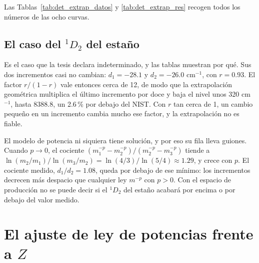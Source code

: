\documentclass[11pt,a4paper]{article}
\begin{document}
Las Tablas~\ref{tab:det_extrap_datos} y \ref{tab:det_extrap_res} recogen todos los números de las
ocho curvas.

\begin{table}[htbp]
  \centering\small
  
  \caption{Los tres últimos tamaños de cada curva de singletes (cm$^{-1}$, referidos al $^3P_0$),
  sus incrementos y la razón entre ellos.}
  \label{tab:det_extrap_datos}
\end{table}

\begin{table}[htbp]
  \centering\small
  
  \caption{Extrapolaciones geométrica y de potencia (cm$^{-1}$), con el error relativo frente al
  NIST entre paréntesis. La tercera columna es el error del último tamaño calculado.}
  \label{tab:det_extrap_res}
\end{table}

\subsection{El caso del \texorpdfstring{$^1D_2$}{1D2} del estaño}

Es el caso que la tesis declara indeterminado, y las tablas muestran por qué. Sus dos incrementos
casi no cambian: $d_1 = -28.1$ y $d_2 = -26.0$ cm$^{-1}$, con $r = 0.93$. El factor $r/(1-r)$ vale
entonces cerca de 12, de modo que la extrapolación geométrica multiplica el último incremento por
doce y baja el nivel unos 320 cm$^{-1}$, hasta 8388.8, un 2.6\,\% por debajo del NIST. Con $r$ tan
cerca de 1, un cambio pequeño en un incremento cambia mucho ese factor, y la extrapolación no es
fiable.

El modelo de potencia ni siquiera tiene solución, y por eso su fila lleva guiones. Cuando
$p \to 0$, el cociente $(m_1^{-p}-m_2^{-p})/(m_2^{-p}-m_3^{-p})$ tiende a
$\ln(m_2/m_1)/\ln(m_3/m_2) = \ln(4/3)/\ln(5/4) \approx 1.29$, y crece con $p$. El cociente medido,
$d_1/d_2 = 1.08$, queda por debajo de ese mínimo: los incrementos decrecen más despacio que
cualquier ley $m^{-p}$ con $p > 0$. Con el espacio de producción no se puede decir si el $^1D_2$
del estaño acabará por encima o por debajo del valor medido.

\section{El ajuste de ley de potencias frente a \texorpdfstring{$Z$}{Z}}
\label{det:potencias}
\end{document}
